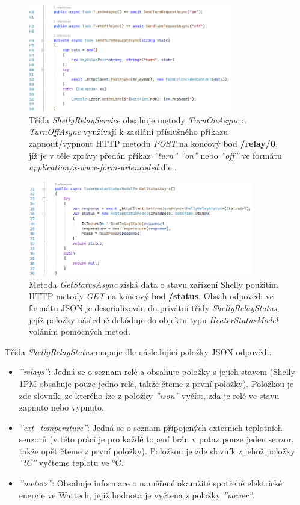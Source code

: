 \pagebreak

\begin{figure}[hbt]
\includegraphics[width=0.8\textwidth]{obrazky-figures/code-shellyturns.png}
\caption{Třída {\it ShellyRelayService} obsahuje metody {\it TurnOnAsync} a {\it TurnOffAsync} využívají k zasílání příslušného příkazu zapnout/vypnout HTTP metodu {\it POST} na koncový bod \textbf{/relay/0}, jíž je v těle zprávy předán příkaz {\it ''turn'' ''on''} nebo {\it ''off''} ve formátu {\it application/x-www-form-urlencoded} dle \cite{shelly_http}.}
\end{figure}

\begin{figure}[hbt]
\includegraphics[width=0.88\textwidth]{obrazky-figures/code-shelly-status.png}
\caption{Metoda {\it GetStatusAsync} získá data o stavu zařízení Shelly použitím HTTP metody {\it GET} na koncový bod \textbf{/status}. Obsah odpovědi ve formátu JSON je deserializován do privátní třídy {\it ShellyRelayStatus}, jejíž položky následně dekóduje do objektu typu {\it HeaterStatusModel} voláním pomocných metod.}
\end{figure}

\noindent Třída {\it ShellyRelayStatus} mapuje dle \cite{shelly-api-status} následující položky JSON odpovědi:
\begin{itemize}
    \item {\it ''relays''}: Jedná se o seznam relé a obsahuje položky s jejich stavem (Shelly 1PM obsahuje pouze jedno relé, takže čteme z první položky). Položkou je zde slovník, ze kterého lze z položky {\it ''ison''} vyčíst, zda je relé ve stavu zapnuto nebo vypnuto.
    \item {\it ''ext\_temperature''}: Jedná se o seznam přípojených externích teplotních senzorů (v této práci je pro každé topení brán v potaz pouze jeden senzor, takže opět čteme z první položky). Položkou je zde slovník z jehož položky {\it ''tC''} vyčteme teplotu ve °C.
    \item {\it ''meters''}: Obsahuje informace o naměřené okamžité spotřebě elektrické energie ve Wattech, jejíž hodnota je vyčtena z položky {\it ''power''}.
\end{itemize}

